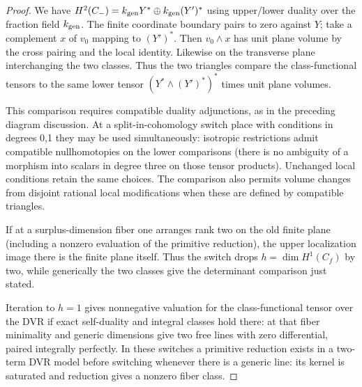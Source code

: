 \begin{proof}
We have \(H^2(C_-)=k_{\rm gen}Y^*\oplus k_{\rm gen}(Y')^*\) using upper/lower duality over the fraction field \(k_{\rm gen}\). The finite coordinate boundary pairs to zero against \(Y\); take a complement \(x\) of \(v_0\) mapping to \((Y')^*\). Then \(v_0\wedge x\) has unit plane volume by the cross pairing and the local identity. Likewise on the transverse plane interchanging the two classes. Thus the two triangles compare the class-functional tensors to the same lower tensor \((Y^*\wedge (Y')^*)^*\) times unit plane volumes. 

This comparison requires compatible duality adjunctions, as in the preceding diagram discussion. At a split-in-cohomology switch place with conditions in degrees 0,1 they may be used simultaneously: isotropic restrictions admit compatible nullhomotopies on the lower comparisons (there is no ambiguity of a morphism into scalars in degree three on those tensor products). Unchanged local conditions retain the same choices. The comparison also permits volume changes from disjoint rational local modifications when these are defined by compatible triangles.

If at a surplus-dimension fiber one arranges rank two on the old finite plane (including a nonzero evaluation of the primitive reduction), the upper localization image there is the finite plane itself. Thus the switch drops \(h=\dim H^1(C_f)\) by two, while generically the two classes give the determinant comparison just stated. 

Iteration to \(h=1\) gives nonnegative valuation for the class-functional tensor over the DVR if exact self-duality and integral classes hold there: at that fiber minimality and generic dimensions give two free lines with zero differential, paired integrally perfectly. In these switches a primitive reduction exists in a two-term DVR model before switching whenever there is a generic line: its kernel is saturated and reduction gives a nonzero fiber class.

\end{proof}

